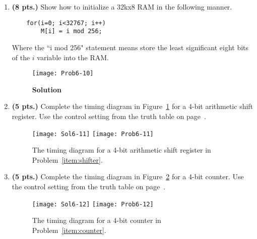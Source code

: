 \begin{enumerate}
\begin{onlysolution}
        \end{onlysolution}

        \ifshowanswers\needspace{2in}\fi
    \item\textbf{ (8 pts.)} Show how to initialize a 32kx8 RAM in the following manner.
\begin{verbatim}
    for(i=0; i<32767; i++)
        M[i] = i mod 256;
\end{verbatim}

        Where the ``i mod 256" statement means store the least significant
        eight bits of the $i$ variable into the RAM.

        \begin{onlysolution} \itshape{
                \begin{figure}[ht]
                    \caption{\textbf{Solution}}
                    \texttt{[image: Prob6-10]}
                \end{figure}
            }
        \end{onlysolution}

        \needspace{2in}
    \item\textbf{ (5 pts.)} Complete the timing diagram in Figure~\ref{fig:hwshift}
        \label{item:shifter}
        for a 4-bit arithmetic shift register.  Use the control setting from the
        truth table on page~\pageref{6-page:shi}.
        \begin{figure}[ht]
            \ifshowanswers \texttt{[image: Sol6-11]}
            \else \texttt{[image: Prob6-11]} \fi
            \caption{The timing diagram for a 4-bit arithmetic shift register
            in Problem~\ref{item:shifter}.}
            \label{fig:hwshift}
        \end{figure}

        \needspace{2in}
    \item\textbf{ (5 pts.)} Complete the timing diagram in Figure~\ref{fig:hwcount}
        \label{item:counter}
        for a 4-bit counter.  Use the control setting from the truth table on
        page~\pageref{6-page:counter}.
        \begin{figure}[ht]
            \ifshowanswers \texttt{[image: Sol6-12]}
            \else \texttt{[image: Prob6-12]} \fi
            \caption{The timing diagram for a 4-bit counter in
            Problem~\ref{item:counter}.}
            \label{fig:hwcount}
        \end{figure}


\end{enumerate}
